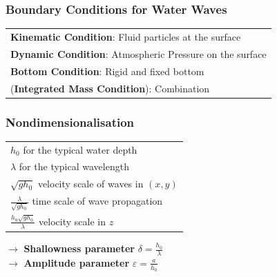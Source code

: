 \documentclass[fleqn]{beamer}
\newcommand{\tabitem}{%
  \usebeamertemplate{itemize item}\hspace*{\labelsep}}
\begin{document}
    \begin{frame}
        \frametitle{Boundary Conditions for Water Waves}
        \begin{center}
        \begin{tabular}{@{}l@{}}
        \tabitem \textbf{Kinematic Condition}: Fluid particles at the
            surface\\
        \tabitem \textbf{Dynamic Condition}: Atmospheric Pressure on
            the surface\\
        \tabitem \textbf{Bottom Condition}: Rigid and fixed bottom\\
        \tabitem (\textbf{Integrated Mass Condition}): Combination
        \end{tabular}
        \end{center}
   \end{frame}

    \begin{frame}
        \frametitle{Nondimensionalisation}
        \begin{center}
        \begin{tabular}{@{}l@{}}
                \tabitem $h_0$ for the typical water depth\\
                \tabitem $\lambda$ for the typical wavelength\\
                \tabitem $\sqrt{g h_0}$ velocity scale of waves in
                $(x, y)$\\
                \tabitem $\frac{\lambda}{\sqrt{g h_0}}$ time scale
                of wave propagation\\
                \tabitem $\frac{h_0 \sqrt{g h_0} }{\lambda}$ velocity scale in $z$
        \end{tabular}
        \end{center}
        \centering
        $\rightarrow$ \textbf{Shallowness parameter} $\delta =
        \frac{h_0}{\lambda}$
        \\
        \centering
        $\rightarrow$ \textbf{Amplitude parameter}
        $\varepsilon=\frac{a}{h_0}$
    \end{frame}
\end{document}
